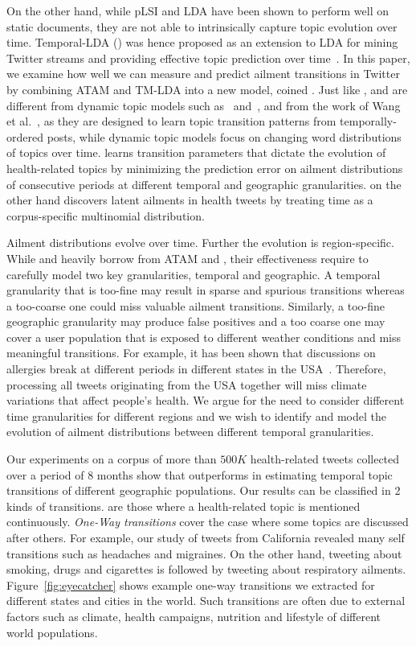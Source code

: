 On the other hand, while pLSI and LDA have been shown to perform well
on static documents, they are not able to intrinsically capture topic
evolution over time.  Temporal-LDA (\tmlda) was hence proposed as an
extension to LDA for mining Twitter streams and providing effective
topic prediction over time~\cite{DBLP:conf/kdd/WangAB12}. In this
paper, we examine how well we can measure and predict ailment
transitions in Twitter by combining ATAM and TM-LDA into a new model,
coined \tmatam.  Just like \tmlda, \tmatam and \tatam are different from dynamic
topic models such as~\cite{DBLP:conf/icml/BleiL06}
and~\cite{DBLP:conf/icdm/LinMHJD11}, and from the work of Wang et
al.~\cite{DBLP:conf/kdd/WangM06}, as they are designed to learn topic
transition patterns from temporally-ordered posts, while dynamic topic
models focus on changing word distributions of topics over
time. \tmatam learns transition parameters that dictate the evolution
of health-related topics by minimizing the prediction error on ailment 
distributions of consecutive periods at different temporal and geographic 
granularities. \tatam on the other hand discovers latent ailments
in health tweets by treating time as a corpus-specific multinomial distribution.

Ailment distributions evolve over time. Further the evolution is
region-specific. While \tmatam and \tatam heavily borrow from ATAM and \tmlda,
their effectiveness require to carefully model two key granularities,
temporal and geographic. A temporal granularity that is too-fine may result in
sparse and spurious transitions whereas a too-coarse one could miss
valuable ailment transitions. Similarly, a too-fine geographic
granularity may produce false positives and a too coarse one may cover
a user population that is exposed to different weather conditions and
miss meaningful transitions. For example, it has been shown that discussions on
allergies break at different periods in different states in the
USA~\cite{atam2}. Therefore, processing all tweets originating from the USA together
will miss climate variations that affect people's health. We argue
for the need to consider different time granularities for different
regions and we wish to identify and model the evolution of ailment
distributions between different temporal granularities.

Our experiments on a corpus of more than $500K$ health-related tweets
collected over a period of 8 months show that \tmatam outperforms
\tmlda in estimating temporal topic transitions of different
geographic populations. Our results can be classified in 2 kinds of
transitions. {\selftransitions} are those where a health-related topic
is mentioned continuously. {\em One-Way transitions} cover the case where
some topics are discussed after others. For example, our
study of tweets from California revealed many self transitions such as
headaches and migraines. On the other hand, tweeting about smoking,
drugs and cigarettes is followed by tweeting about respiratory
ailments. Figure~\ref{fig:eyecatcher} shows example one-way transitions we extracted for different states and cities in the
world. Such transitions are often due to external factors such as climate, health campaigns, nutrition and lifestyle of different world populations.

